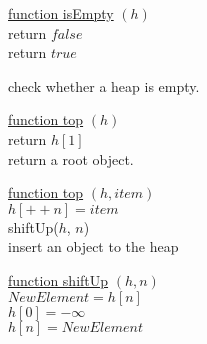\documentclass{article}
\begin{document}
\begin{algorithm}
    

    \underline{function isEmpty} $(h)$\\
      {
        return $false$\\
      }
      {
        return $true$\\
      }
    
    \caption{check whether a heap is empty.}
\end{algorithm}

\begin{algorithm}
    

    \underline{function top} $(h)$\\
        return $h[1]$\\
    \caption{return a root object.}
\end{algorithm}



\begin{algorithm}
    

    \underline{function top} $(h, item)$\\
        $h[++n] = item$\\
        shiftUp($h$, $n$)\\
    \caption{insert an object to the heap}
    
    \BlankLine
    \BlankLine
    
    \underline{function shiftUp} $(h, n)$\\
    $NewElement = h[n]$\\
    $h[0] = -\infty$\\
    $h[n] = NewElement$
    
\end{algorithm}
\end{document}
